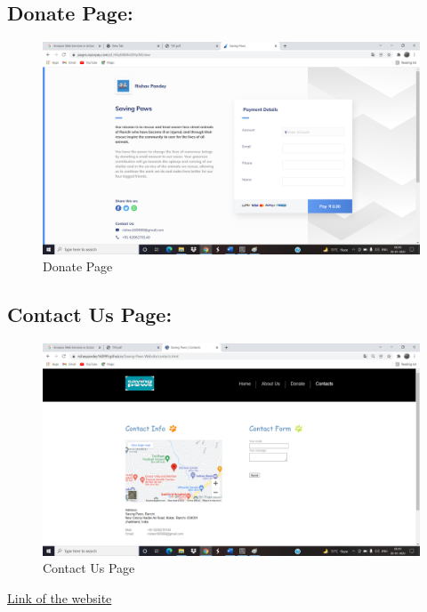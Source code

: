 \documentclass[12pt]{article}
\begin{document}
\subsection{Donate Page:}
\begin{figure}[h]
\centering
\includegraphics[scale=0.23]{Untitled4.png}
\caption{Donate Page}
\label{Untitled4.png}
\end{figure}



\subsection{Contact Us Page:}
\begin{figure}[h]
\centering
\includegraphics[scale=0.23]{Untitled5.png}
\caption{Contact Us Page}
\label{Untitled5.png}
\end{figure}





\href{https://rishavpandey160999.github.io/Saving-Paws-Website/}{Link of the website}\\
\end{document}
